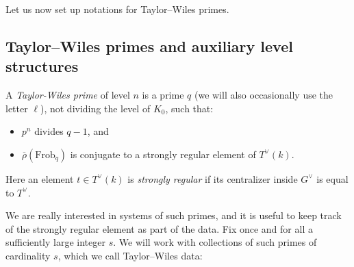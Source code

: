 \documentclass[10pt]{amsart}
\newcommand{\rhobar}{\overline{\rho}}
\newcommand{\Frob}{\mathrm{Frob}}
\theoremstyle{remark}
\begin{document}
 
 
  

 
 
Let us now set up notations for Taylor--Wiles primes.  




\subsection{Taylor--Wiles primes and auxiliary level structures} \label{TWprimes stuff}
A {\em Taylor-Wiles prime} of level $n$ is a prime $q$ (we will also occasionally use the letter $\ell$), not dividing the level of $K_0$, 
such that:
\begin{itemize}
\item[-] $p^n$ divides $q-1$, and 
\item[-] $\rhobar(\Frob_q)$ is conjugate to a strongly regular element of $T^{\vee}(k)$.
\end{itemize}
Here an element $t \in T^{\vee}(k)$ is {\em strongly regular} if its centralizer inside $G^{\vee}$ is equal to $T^{\vee}$. 


We are really interested in systems of such primes, and it is useful to keep track of the  strongly regular element as part of the data.
Fix once and for all a sufficiently large integer $s$. We will work with collections of such primes of cardinality $s$,  
which we call Taylor--Wiles data:
\end{document}
